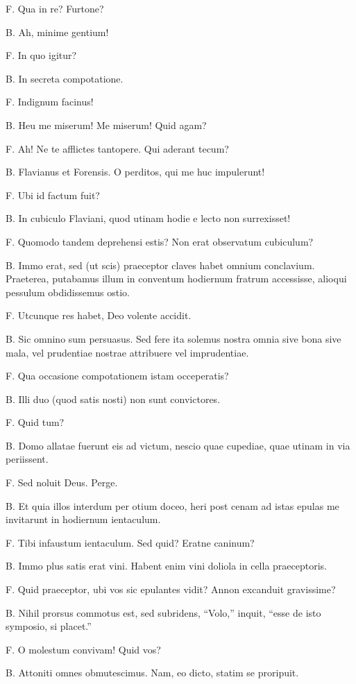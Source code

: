 \documentclass{article}
\begin{document}
F. Qua in re? Furtone?

B. Ah, minime gentium!

F. In quo igitur?

B. In secreta compotatione.

F. Indignum facinus!

B. Heu me miserum! Me miserum! Quid agam?

F. Ah! Ne te afflictes tantopere. Qui aderant tecum?

B. Flavianus et Forensis. O perditos, qui me huc impulerunt!

F. Ubi id factum fuit?

B. In cubiculo Flaviani, quod utinam hodie e lecto non surrexisset!

F. Quomodo tandem deprehensi estis? Non erat observatum cubiculum?

B. Immo erat, sed (ut scis) praeceptor claves habet omnium conclavium. Praeterea, putabamus illum in conventum hodiernum fratrum accessisse, alioqui pessulum obdidissemus ostio.

F. Utcunque res habet, Deo volente accidit.

B. Sic omnino sum persuasus. Sed fere ita solemus nostra omnia sive bona sive mala, vel prudentiae nostrae attribuere vel imprudentiae.

F. Qua occasione compotationem istam occeperatis?

B. Illi duo (quod satis nosti) non sunt convictores.

F. Quid tum?

B. Domo allatae fuerunt eis ad victum, nescio quae cupediae, quae utinam in via periissent.

F. Sed noluit Deus. Perge.

B. Et quia illos interdum per otium doceo, heri post cenam ad istas epulas me invitarunt in hodiernum ientaculum.

F. Tibi infaustum ientaculum. Sed quid? Eratne caninum?

B. Immo plus satis erat vini. Habent enim vini doliola in cella praeceptoris.

F. Quid praeceptor, ubi vos sic epulantes vidit? Annon excanduit gravissime?

B. Nihil prorsus commotus est, sed subridens, ``Volo,'' inquit, ``esse de isto symposio, si placet.''

F. O molestum convivam! Quid vos?

B. Attoniti omnes obmutescimus. Nam, eo dicto, statim se proripuit.
\end{document}
